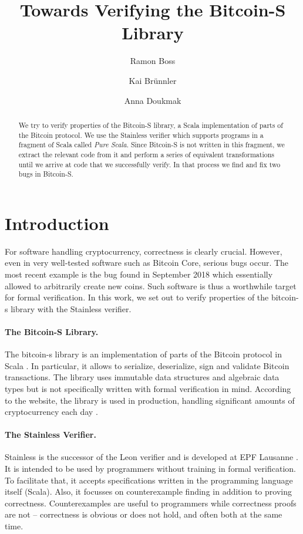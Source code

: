 \documentclass[hyphens, a4paper,USenglish,cleveref, autoref, thm-restate]{oasics-v2019}
\title{Towards Verifying the Bitcoin-S Library}
\author{Ramon Boss}{Bern University of Applied Sciences, Switzerland}{ramon.boss@outlook.com}{}{}
\author{Kai Brünnler}{Bern University of Applied Sciences, Switzerland}{kai.bruennler@bfh.ch}{}{}
\author{Anna Doukmak}{Bern University of Applied Sciences, Switzerland}{anna.doukmak@gmail.com}{}{}
\begin{document}
\maketitle

\begin{abstract}
  We try to verify properties of the Bitcoin-S library, a Scala
  implementation of parts of the Bitcoin protocol. We use the
  Stainless verifier which supports programs in a fragment of Scala
  called \emph{Pure Scala}. Since Bitcoin-S is not written in this
  fragment, we extract the relevant code from it and perform a series
  of equivalent transformations until we arrive at code that we
  successfully verify. In that process we find and fix two bugs in
  Bitcoin-S.
\end{abstract}

\section{Introduction}

For software handling cryptocurrency, correctness is clearly crucial.
However, even in very well-tested software such as Bitcoin Core,
serious bugs occur. The most recent example is the bug found in
September 2018 \cite{cve201817144} which essentially allowed to
arbitrarily create new coins. Such software is thus a worthwhile
target for formal verification. In this work, we set out to verify
properties of the bitcoin-s library with the Stainless verifier.

\paragraph{The Bitcoin-S Library.} The bitcoin-s library is an
implementation of parts of the Bitcoin protocol in Scala
\cite{BitcoinS:website,BitcoinS:github}. In particular, it allows to
serialize, deserialize, sign and validate Bitcoin transactions. The
library uses immutable data structures and algebraic data types but is
not specifically written with formal verification in mind. According
to the website, the library is used in production, handling
significant amounts of cryptocurrency each day
\cite{BitcoinS:website}.

\paragraph{The Stainless Verifier.} Stainless is the successor of the
Leon verifier and is developed at EPF Lausanne
\cite{DBLP:conf/ecoop/BlancKKS13,DBLP:conf/pldi/VoirolKK15,DBLP:conf/pldi/BlancK15}. It
is intended to be used by programmers without training in formal
verification. To facilitate that, it accepts specifications written in
the programming language itself (Scala). Also, it focusses on
counterexample finding in addition to proving
correctness. Counterexamples are useful to programmers while
correctness proofs are not -- correctness is obvious or does not hold,
and often both at the same time.
\end{document}
